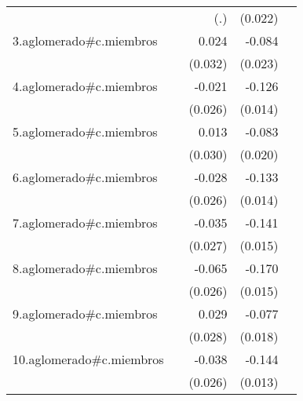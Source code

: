 {\begin{longtable}{l*{4}{D{.}{.}{-1}}}
            &                     &         (.)         &     (0.022)         &                     \\
\addlinespace
3.aglomerado#c.miembros&                     &       0.024         &      -0.084\sym{***}&                     \\
            &                     &     (0.032)         &     (0.023)         &                     \\
\addlinespace
4.aglomerado#c.miembros&                     &      -0.021         &      -0.126\sym{***}&                     \\
            &                     &     (0.026)         &     (0.014)         &                     \\
\addlinespace
5.aglomerado#c.miembros&                     &       0.013         &      -0.083\sym{***}&                     \\
            &                     &     (0.030)         &     (0.020)         &                     \\
\addlinespace
6.aglomerado#c.miembros&                     &      -0.028         &      -0.133\sym{***}&                     \\
            &                     &     (0.026)         &     (0.014)         &                     \\
\addlinespace
7.aglomerado#c.miembros&                     &      -0.035         &      -0.141\sym{***}&                     \\
            &                     &     (0.027)         &     (0.015)         &                     \\
\addlinespace
8.aglomerado#c.miembros&                     &      -0.065\sym{*}  &      -0.170\sym{***}&                     \\
            &                     &     (0.026)         &     (0.015)         &                     \\
\addlinespace
9.aglomerado#c.miembros&                     &       0.029         &      -0.077\sym{***}&                     \\
            &                     &     (0.028)         &     (0.018)         &                     \\
\addlinespace
10.aglomerado#c.miembros&                     &      -0.038         &      -0.144\sym{***}&                     \\
            &                     &     (0.026)         &     (0.013)         &                     \\

\end{longtable}}
